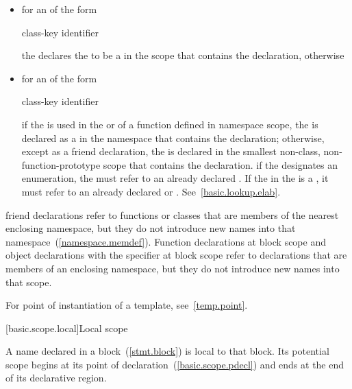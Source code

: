 \begin{itemize}
\item for an  of the form

\begin{ncbnf}
class-key identifier \terminal{;}
\end{ncbnf}

the  declares the
 to be a
 in the scope that contains the declaration,
otherwise
\item for an  of the form

\begin{ncbnf}
class-key identifier
\end{ncbnf}

if the
 is used in the
 or 
of a function defined in namespace scope, the  is
declared as a  in the namespace that contains the
declaration; otherwise, except as a friend declaration, the
 is declared in the smallest non-class,
non-function-prototype scope that contains the declaration. \enternote
if the  designates an enumeration,
the  must refer to an already declared
. If the  in the
 is a ,
it must refer to an already declared  or
. See~\ref{basic.lookup.elab}. \exitnote
\end{itemize}

\pnum
\enternote friend declarations refer to functions or classes that are
members of the nearest enclosing namespace, but they do not introduce
new names into that namespace~(\ref{namespace.memdef}). Function
declarations at block scope and object declarations with the
 specifier at block scope refer to declarations that are
members of an enclosing namespace, but they do not introduce new names
into that scope.
\exitnote

\pnum
\enternote For point of instantiation of a template,
see~\ref{temp.point}.\exitnote%

[basic.scope.local]{Local scope}

\pnum
{}%
%
A name declared in a block~(\ref{stmt.block}) is local to that block.
Its potential scope begins at its point of
declaration~(\ref{basic.scope.pdecl}) and ends at the end of its
declarative region.

